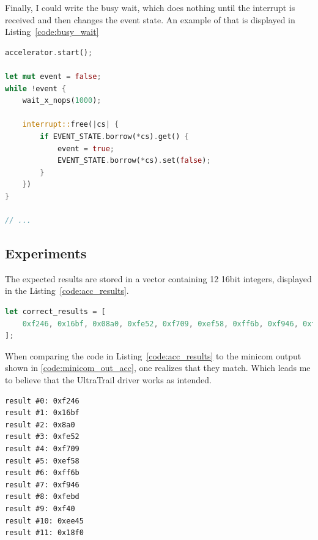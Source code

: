 Finally, I could write the busy wait, which does nothing until the interrupt is received
and then changes the event state.
An example of that is displayed in Listing~\ref{code:busy_wait}

\begin{minipage}{\textwidth}
\begin{lstlisting}[style=colorEX,language=Rust,caption={Snippet of the busy wait that waits for UltraTrail to finish},label={code:busy_wait}]
accelerator.start();

let mut event = false;
while !event {
    wait_x_nops(1000);

    interrupt::free(|cs| {
        if EVENT_STATE.borrow(*cs).get() {
            event = true;
            EVENT_STATE.borrow(*cs).set(false);
        }
    })
}

// ...
\end{lstlisting}
\end{minipage}

\subsection{Experiments}

The expected results are stored in a vector containing 12 16bit integers, displayed in the Listing~\ref{code:acc_results}.

\begin{minipage}{\textwidth}
\begin{lstlisting}[style=colorEX,language=Rust,caption={The expected results from the driver test},label={code:acc_results}]
let correct_results = [
    0xf246, 0x16bf, 0x08a0, 0xfe52, 0xf709, 0xef58, 0xff6b, 0xf946, 0xfebd, 0x0f40, 0xee45, 0x18f0,
];
\end{lstlisting}
\end{minipage}

When comparing the code in Listing~\ref{code:acc_results} to the minicom output shown in \ref{code:minicom_out_acc},
one realizes that they match. Which leads me to believe that the UltraTrail driver works as intended.

\begin{minipage}{\textwidth}
\begin{lstlisting}[style=colorEx,caption={Minicom output after executing the driver test},label={code:minicom_out_acc}]
result #0: 0xf246
result #1: 0x16bf
result #2: 0x8a0
result #3: 0xfe52
result #4: 0xf709
result #5: 0xef58
result #6: 0xff6b
result #7: 0xf946
result #8: 0xfebd
result #9: 0xf40
result #10: 0xee45
result #11: 0x18f0
\end{lstlisting}
\end{minipage}
